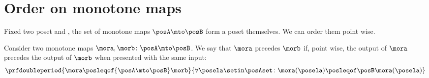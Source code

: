 \section{Order on monotone maps}

Fixed two poset \posA and \posB, the set of monotone maps $\posA \mto \posB$ form a poset themselves.
We can order them point wise.

\begin{definition}
    \label{def:order-monotone-maps}
    Consider two monotone maps $\mora,\morb\colon\posA\mto\posB$.
    We say that $\mora$ precedes $\morb$ if, point wise, the output of $\mora$ precedes the output of $\morb$ when presented with the same input:
    \begin{equation}
        \prfdoubleperiod{
            \mora \posleqof{\posA\mto\posB} \morb
        }{
            \forall \posela\setin\posAset \colon \mora(\posela) \posleqof\posB \mora(\posela)
        }
    \end{equation}
\end{definition}

